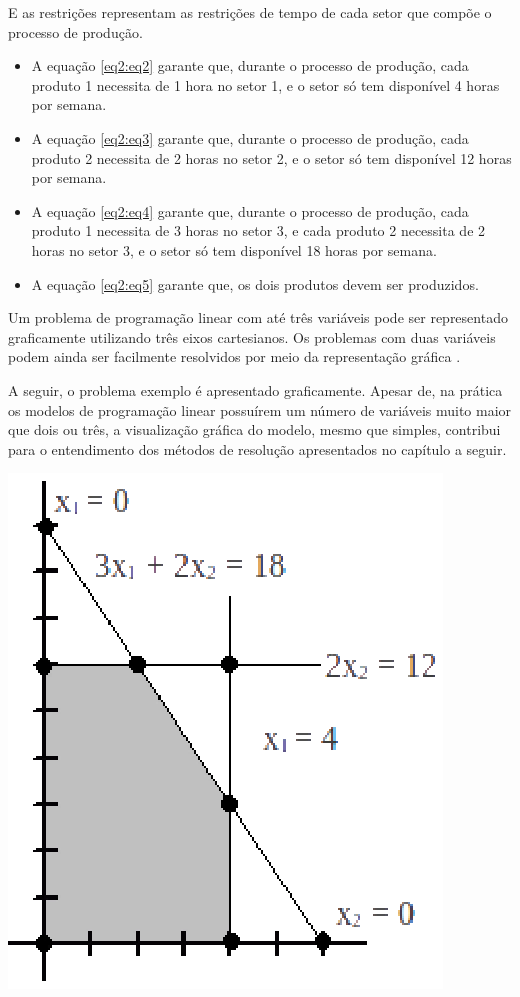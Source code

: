 E as restrições representam as restrições de tempo de cada setor que compõe o processo de produção.
\begin{itemize}
\item A equação \ref{eq2:eq2} garante que, durante o processo de produção, cada produto 1 necessita de 1 hora no setor 1, e o setor só tem disponível 4 horas por semana.
\item A equação \ref{eq2:eq3} garante que, durante o processo de produção, cada produto 2 necessita de 2 horas no setor 2, e o setor só tem disponível 12 horas por semana.
\item A equação \ref{eq2:eq4} garante que, durante o processo de produção, cada produto 1 necessita de 3 horas no setor 3, e cada produto 2 necessita de 2 horas no setor 3, e o setor só tem disponível 18 horas por semana.
\item A equação \ref{eq2:eq5} garante que, os dois produtos devem ser produzidos.
\end{itemize}

Um problema de programação linear com até três variáveis pode ser representado graficamente utilizando três eixos cartesianos. Os problemas com duas variáveis podem ainda ser facilmente resolvidos por meio da representação gráfica \cite{Passos}. 

A seguir, o problema exemplo é apresentado graficamente. Apesar de, na prática os modelos de programação linear possuírem um número de variáveis muito maior que dois ou três, a visualização gráfica do modelo, mesmo que simples, contribui para o entendimento dos métodos de resolução apresentados no capítulo a seguir.
\begin{center}
	\includegraphics[scale=1.0]{graficos/simplex_graf}
	\label{img:simplex_grafico}
\end{center}


